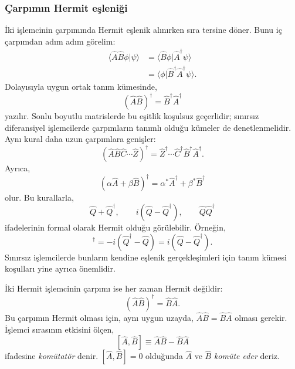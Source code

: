 \subsubsection{Çarpımın Hermit eşleniği}

İki işlemcinin çarpımında Hermit eşlenik alınırken sıra tersine döner.
Bunu iç çarpımdan adım adım görelim:
\begin{align}
 \langle\hat A\hat B\phi|\psi\rangle
 &=\langle\hat B\phi|\hat A^\dagger\psi\rangle\\
 &=\langle\phi|\hat B^\dagger\hat A^\dagger\psi\rangle.
\end{align}
Dolayısıyla uygun ortak tanım kümesinde,
\begin{equation}
 \boxed{(\hat A\hat B)^\dagger
             =\hat B^\dagger\hat A^\dagger}
 \label{eq:05_carpim_eslenik}
\end{equation}
yazılır. Sonlu boyutlu matrislerde bu eşitlik koşulsuz geçerlidir;
sınırsız diferansiyel işlemcilerde çarpımların tanımlı olduğu kümeler
de denetlenmelidir. Aynı kural daha uzun çarpımlara genişler:
\begin{equation}
 (\hat A\hat B\hat C\cdots\hat Z)^\dagger
 =\hat Z^\dagger\cdots\hat C^\dagger\hat B^\dagger\hat A^\dagger.
\end{equation}
Ayrıca,
\begin{equation}
 (\alpha\hat A+\beta\hat B)^\dagger
 =\alpha^*\hat A^\dagger+\beta^*\hat B^\dagger
\end{equation}
olur. Bu kurallarla,
\begin{equation}
 \hat Q+\hat Q^\dagger,\qquad
 i(\hat Q-\hat Q^\dagger),\qquad
 \hat Q\hat Q^\dagger
\end{equation}
ifadelerinin formal olarak Hermit olduğu görülebilir. Örneğin,
\begin{equation}
 [i(\hat Q-\hat Q^\dagger)]^\dagger
 =-i(\hat Q^\dagger-\hat Q)
 =i(\hat Q-\hat Q^\dagger).
\end{equation}
Sınırsız işlemcilerde bunların kendine eşlenik gerçekleşimleri için
tanım kümesi koşulları yine ayrıca önemlidir.

İki Hermit işlemcinin çarpımı ise her zaman Hermit değildir:
\begin{equation}
 (\hat A\hat B)^\dagger=\hat B\hat A.
\end{equation}
Bu çarpımın Hermit olması için, aynı uygun uzayda,
$\hat A\hat B=\hat B\hat A$ olması gerekir. İşlemci sırasının
etkisini ölçen,
\begin{equation}
 \boxed{[\hat A,\hat B]\equiv\hat A\hat B-\hat B\hat A}
 \label{eq:05_komutator_tanim}
\end{equation}
ifadesine \emph{komütatör} denir. $[\hat A,\hat B]=0$ olduğunda
$\hat A$ ve $\hat B$ \emph{komüte eder} deriz.

